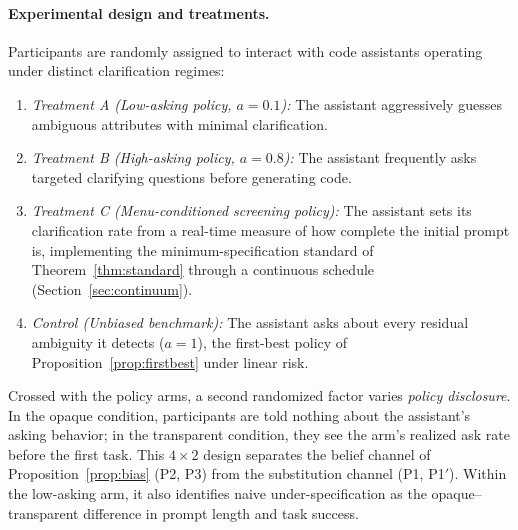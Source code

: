 \documentclass[11pt]{article}
\begin{document}
\paragraph{Experimental design and treatments.}
Participants are randomly assigned to interact with code assistants operating under distinct clarification regimes:
\begin{enumerate}[leftmargin=*]
\item \emph{Treatment A (Low-asking policy, $a = 0.1$):} The assistant aggressively guesses ambiguous attributes with minimal clarification.
\item \emph{Treatment B (High-asking policy, $a = 0.8$):} The assistant frequently asks targeted clarifying questions before generating code.
\item \emph{Treatment C (Menu-conditioned screening policy):} The assistant sets its clarification rate from a real-time measure of how complete the initial prompt is, implementing the minimum-specification standard of Theorem~\ref{thm:standard} through a continuous schedule (Section~\ref{sec:continuum}).
\item \emph{Control (Unbiased benchmark):} The assistant asks about every residual ambiguity it detects ($a = 1$), the first-best policy of Proposition~\ref{prop:firstbest} under linear risk.
\end{enumerate}
Crossed with the policy arms, a second randomized factor varies \emph{policy disclosure}. In the opaque condition, participants are told nothing about the assistant's asking behavior; in the transparent condition, they see the arm's realized ask rate before the first task. This $4 \times 2$ design separates the belief channel of Proposition~\ref{prop:bias} (P2, P3) from the substitution channel (P1, P1$'$). Within the low-asking arm, it also identifies naive under-specification as the opaque--transparent difference in prompt length and task success.
\end{document}
